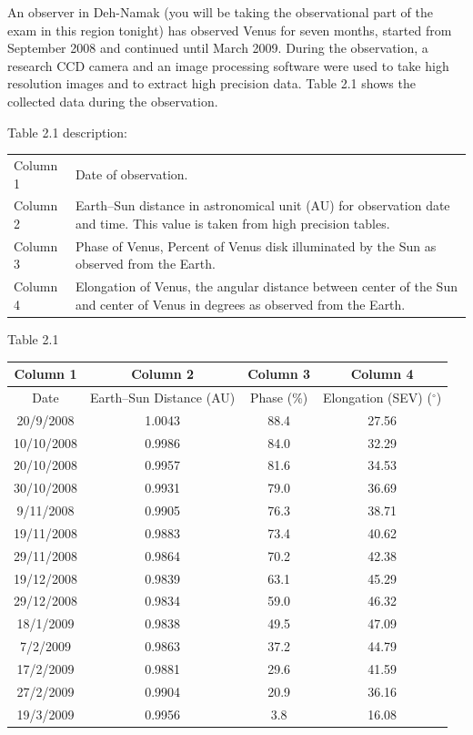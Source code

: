 An observer in Deh-Namak (you will be taking the observational part of the
exam in this region tonight) has observed Venus for seven months, started
from September 2008 and continued until March 2009. During the observation, a
research CCD camera and an image processing software were used to take high
resolution images and to extract high precision data. Table 2.1 shows the
collected data during the observation.

Table 2.1 description:
\begin{center}
\begin{tabular}{lp{9cm}}
Column 1 & Date of observation. \\
Column 2 & Earth--Sun distance in astronomical unit (AU) for observation
  date and time. This value is taken from high precision tables. \\
Column 3 & Phase of Venus, Percent of Venus disk illuminated by the Sun as
  observed from the Earth. \\
Column 4 & Elongation of Venus, the angular distance between center of the
  Sun and center of Venus in degrees as observed from the Earth. \\
\end{tabular}
\end{center}

\begin{center}
Table 2.1

\begin{tabular}{c|c|c|c}
Column 1 & Column 2 & Column 3 & Column 4 \\
\hline
Date & Earth--Sun Distance (AU) & Phase (\%)
  & Elongation (SEV) ($^\circ$) \\
\hline
20/9/2008   & 1.0043 & 88.4 & 27.56 \\
10/10/2008  & 0.9986 & 84.0 & 32.29 \\
20/10/2008  & 0.9957 & 81.6 & 34.53 \\
30/10/2008  & 0.9931 & 79.0 & 36.69 \\
9/11/2008   & 0.9905 & 76.3 & 38.71 \\
19/11/2008  & 0.9883 & 73.4 & 40.62 \\
29/11/2008  & 0.9864 & 70.2 & 42.38 \\
19/12/2008  & 0.9839 & 63.1 & 45.29 \\
29/12/2008  & 0.9834 & 59.0 & 46.32 \\
18/1/2009   & 0.9838 & 49.5 & 47.09 \\
7/2/2009    & 0.9863 & 37.2 & 44.79 \\
17/2/2009   & 0.9881 & 29.6 & 41.59 \\
27/2/2009   & 0.9904 & 20.9 & 36.16 \\
19/3/2009   & 0.9956 & 3.8  & 16.08 \\
\end{tabular}
\end{center}

